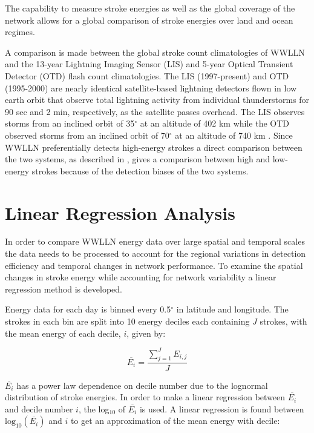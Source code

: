 The capability to measure stroke energies as well as the global coverage of the network allows for a global comparison of stroke energies over land and ocean regimes.

A comparison is made between the global stroke count climatologies of WWLLN and the 13-year Lightning Imaging Sensor (LIS) and 5-year Optical Transient Detector (OTD) flash count climatologies. 
The LIS (1997-present) and OTD (1995-2000) are nearly identical satellite-based lightning detectors flown in low earth orbit that observe total lightning activity from individual thunderstorms for 90 sec and 2 min, respectively, as the satellite passes overhead.
The LIS observes storms from an inclined orbit of 35$^\circ$ at an altitude of 402 km while the OTD observed storms from an inclined orbit of 70$^\circ$ at an altitude of 740 km \citep{Christian1999, Christian2003}.
Since WWLLN preferentially detects high-energy strokes \citep{Hutchins2012a} a direct comparison between the two systems, as described in \citet{Virts2013}, gives a comparison between high and low-energy strokes because of the detection biases of the two systems.

\section{Linear Regression Analysis}
\label{landsea:section:secLinReg}

In order to compare WWLLN energy data over large spatial and temporal scales the data needs to be processed to account for the regional variations in detection efficiency and temporal changes in network performance.
To examine the spatial changes in stroke energy while accounting for network variability a linear regression method is developed.

Energy data for each day is binned every 0.5$^\circ$ in latitude and longitude.
The strokes in each bin are split into 10 energy deciles each containing $J$ strokes, with the mean energy of each decile, $i$, given by:

\begin{equation}
\overline{E_i} = \frac{\sum_{j=1}^J E_{i,j}}{J} 
\end{equation}

$\overline{E_i}$ has a power law dependence on decile number due to the lognormal distribution of stroke energies.
In order to make a linear regression between $\overline{E_i}$ and decile number $i$, the log$_{10}$ of $\overline{E_i}$ is used. 
A linear regression is found between $\text{log}_{10}(\bar{E_i})$ and $i$ to get an approximation of the mean energy with decile:

